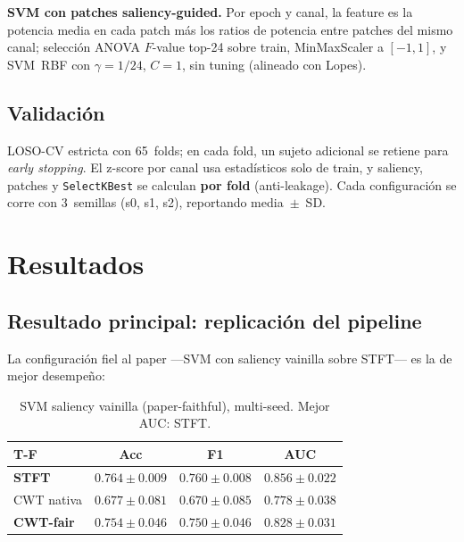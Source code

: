 \documentclass[11pt, a4paper]{article}
\begin{document}
\textbf{SVM con patches saliency-guided.} Por epoch y canal, la feature es
la potencia media en cada patch más los ratios de potencia entre patches
del mismo canal; selección ANOVA $F$-value top-24 sobre train, MinMaxScaler
a $[-1,1]$, y SVM~RBF con $\gamma=1/24$, $C=1$, sin tuning (alineado con
Lopes).

\subsection{Validación}
\label{sec:validacion}

LOSO-CV estricta con 65~folds; en cada fold, un sujeto adicional se retiene
para \emph{early stopping}. El z-score por canal usa estadísticos solo de
train, y saliency, patches y \texttt{SelectKBest} se calculan
\textbf{por fold} (anti-leakage). Cada configuración se corre con
3~semillas (s0, s1, s2), reportando media~$\pm$~SD.

\section{Resultados}

\subsection{Resultado principal: replicación del pipeline}
\label{sec:resultado_principal}

La configuración fiel al paper ---SVM con saliency vainilla sobre STFT---
es la de mejor desempeño:

\begin{table}[H]
\centering
\small
\begin{tabular}{lccc}
\toprule
T-F & Acc & F1 & AUC \\
\midrule
\textbf{STFT} & $\mathbf{0.764 \pm 0.009}$ & $\mathbf{0.760 \pm 0.008}$ & $\mathbf{0.856 \pm 0.022}$ \\
CWT nativa & $0.677 \pm 0.081$ & $0.670 \pm 0.085$ & $0.778 \pm 0.038$ \\
\textbf{CWT-fair} & $0.754 \pm 0.046$ & $0.750 \pm 0.046$ & $\mathbf{0.828 \pm 0.031}$ \\
\bottomrule
\end{tabular}
\caption{SVM saliency vainilla (paper-faithful), multi-seed. Mejor AUC: STFT.}
\label{tab:svm_vanilla}
\end{table}
\end{document}
